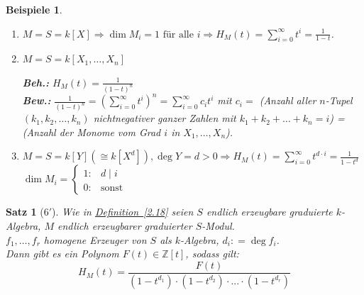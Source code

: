 \documentclass[a4paper,12pt]{scrbook}
\theoremstyle{break}
\theoremstyle{nonumberbreak}
\newtheorem{nnBsp}{Beispiele}
\newtheorem{nnSatz}{Satz}
\theoremstyle{nonumberplain}
\newcommand{\defeqr}[0]{\mathrel{\mathop:}=}
\newcommand{\myref}[2]{%
\hyperref[#2]{#1~\ref*{#2}}%
}
\begin{document}
\begin{nnBsp}
  \begin{enumerate}
    \item[1.)] $M = S = k[X] \Rightarrow \dim M_i = 1 \text{ für alle }i
               \Rightarrow H_M(t) = \sum_{i=0}^{\infty}t^i = \frac{1}{1-t}$.
    \item[2.)] $M = S = k[X_1, \dots, X_n]$

               \textbf{Beh.:} $H_M(t) = \frac{1}{(1-t)^n}$\\
               \textbf{Bew.:} $\frac{1}{(1-t)^n} = \left( \sum_{i=0}^{\infty}
               t^i\right)^n = \sum_{i=0}^{\infty} c_i t^i$ mit $c_i =
               $ (Anzahl aller $n$-Tupel $\left(k_1,k_2,\dots ,k_n\right)$ nichtnegativer
               ganzer Zahlen mit $k_1+k_2+\dots +k_n = i$) = (Anzahl der
               Monome vom Grad $i$ in $X_1, \dots, X_n$).
    \item[3.)] $M = S = k[Y] (\cong k[X^d]), \deg Y = d > 0 \Rightarrow
               H_M(t) = \sum_{i = 0}^{\infty} t^{d \cdot i} = \frac{1}{1-t^d}$\\
               $\dim M_i = \begin{cases}1: & d \mid i\\ 0: & \text{sonst} \end{cases}$
  \end{enumerate}
\end{nnBsp}

\begin{nnSatz}[$6'$]
  Wie in \myref{Definition}{2.18} seien $S$ endlich erzeugbare graduierte $k$-Algebra, $M$ endlich erzeugbarer graduierter $S$-Modul.\\
  $f_1, \dots, f_r$ homogene Erzeuger von $S$ als $k$-Algebra, $d_i \defeqr \deg f_i$.\\
  Dann gibt es ein Polynom $F(t) \in \mathbb{Z}[t]$, sodass gilt:
  $$H_M(t) = \frac{F(t)}{(1-t^{d_1}) \cdot (1-t^{d_2}) \cdot ... \cdot 
  (1-t^{d_r})}$$
\end{nnSatz}
\end{document}
